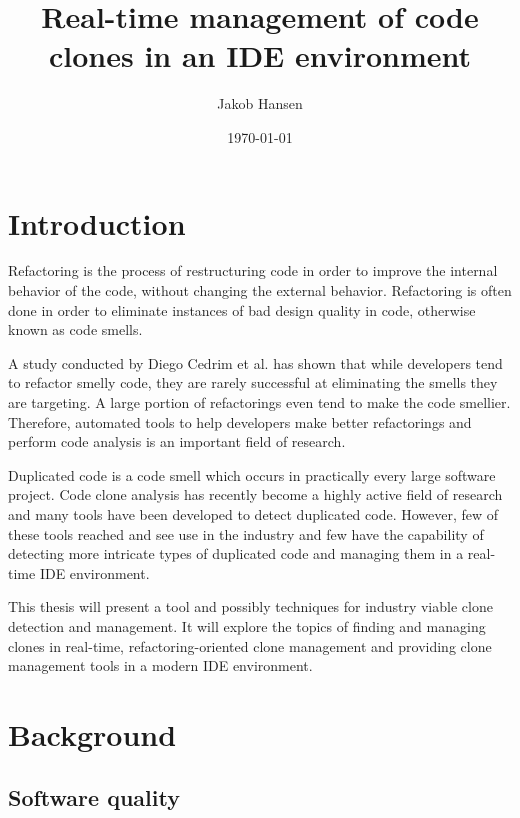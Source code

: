 \documentclass[12pt]{article}
\title{\vspace{-20px}Real-time management of code clones in an IDE environment}
\author{Jakob Hansen}
\date{\today}
\begin{document}
\maketitle

\newpage

\tableofcontents

\newpage

\section{Introduction}

Refactoring is the process of restructuring code in order to improve the internal behavior
of the code, without changing the external behavior\cite[9]{fowlerrefactoring}.
Refactoring is often done in order to eliminate instances of bad design quality in code,
otherwise known as code smells.

A study conducted by Diego Cedrim et al. has shown that while developers tend to refactor
smelly code, they are rarely successful at eliminating the smells they are
targeting\cite{Rohit_Gheyi_Impact}. A large portion of refactorings even tend to make the
code smellier. Therefore, automated tools to help developers make better refactorings and
perform code analysis is an important field of research.

Duplicated code is a code smell which occurs in practically every large software project.
Code clone analysis has recently become a highly active field of research and many tools have
been developed to detect duplicated code\cite[7]{Inoue_introduction_to_cc}. However, few of
these tools reached and see use in the industry and few have the capability of detecting
more intricate types of duplicated code and managing them in a real-time IDE environment.

This thesis will present a tool and possibly techniques for industry viable clone
detection and management. It will explore the topics of finding and managing clones in
real-time, refactoring-oriented clone management and providing clone management tools in a
modern IDE environment.

\section{Background}

\subsection{Software quality}
\end{document}
